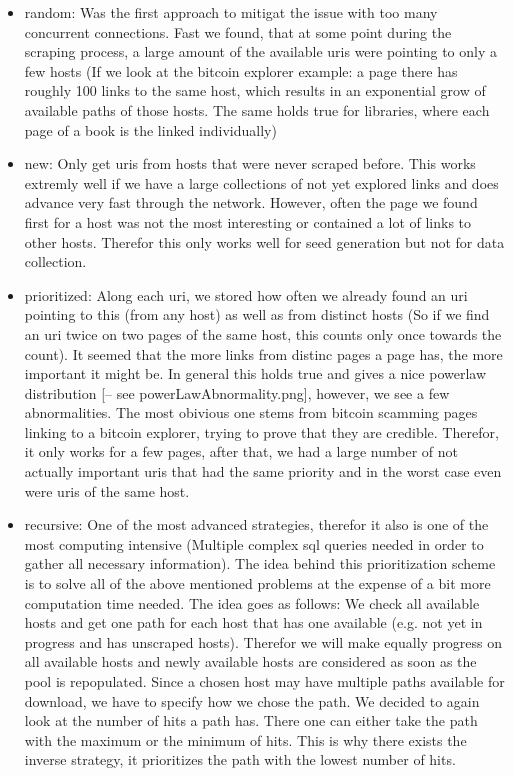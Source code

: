 \documentclass[USenglish,oneside,twocolumn]{article}
\begin{document}
\begin{itemize}
\begin{itemize}
      \begin{itemize}
        \item random: Was the first approach to mitigat the issue with too many concurrent connections. Fast we found, that at some point during the scraping process, a large amount of the available uris were pointing to only a few hosts (If we look at the bitcoin explorer example: a page there has roughly 100 links to the same host, which results in an exponential grow of available paths of those hosts. The same holds true for libraries, where each page of a book is the linked individually)
        \item new: Only get uris from hosts that were never scraped before. This works extremly well if we have a large collections of not yet explored links and does advance very fast through the network. However, often the page we found first for a host was not the most interesting or contained a lot of links to other hosts. Therefor this only works well for seed generation but not for data collection.
        \item prioritized: Along each uri, we stored how often we already found an uri pointing to this (from any host) as well as from distinct hosts (So if we find an uri twice on two pages of the same host, this counts only once towards the count). It seemed that the more links from distinc pages a page has, the more important it might be. In general this holds true and gives a nice powerlaw distribution [-- see powerLawAbnormality.png], however, we see a few abnormalities. The most obivious one stems from bitcoin scamming pages linking to a bitcoin explorer, trying to prove that they are credible. Therefor, it only works for a few pages, after that, we had a large number of not actually important uris that had the same priority and in the worst case even were uris of the same host.
        \item recursive: One of the most advanced strategies, therefor it also is one of the most computing intensive (Multiple complex sql queries needed in order to gather all necessary information). The idea behind this prioritization scheme is to solve all of the above mentioned problems at the expense of a bit more computation time needed. The idea goes as follows: We check all available hosts and get one path for each host that has one available (e.g. not yet in progress and has unscraped hosts). Therefor we will make equally progress on all available hosts and newly available hosts are considered as soon as the pool is repopulated. Since a chosen host may have multiple paths available for download, we have to specify how we chose the path. We decided to again look at the number of hits a path has. There one can either take the path with the maximum or the minimum of hits. This is why there exists the inverse strategy, it prioritizes the path with the lowest number of hits.

\end{itemize}
\end{itemize}
\end{itemize}
\end{document}
